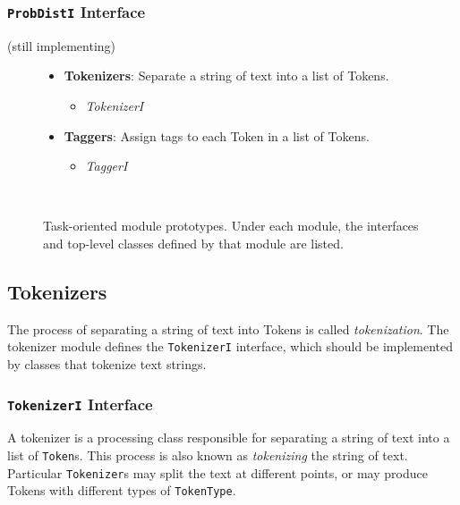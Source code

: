\documentclass{article}
\begin{document}
\subsubsection{\texttt{ProbDistI} Interface}

(still implementing)

\begin{figure}
\noindent
\begin{centering}
\begin{boxedminipage}{.95\textwidth}
\begin{itemize}
  \item \textbf{Tokenizers}: Separate a string of text into a list of
       Tokens. 
  \begin{itemize}
     \item \textit{TokenizerI}
  \end{itemize}

  \item \textbf{Taggers}: Assign tags to each Token in a list of Tokens.
  \begin{itemize}
     \item \textit{TaggerI}
  \end{itemize}
\end{itemize}
\end{boxedminipage}\\
\end{centering}
 \caption[Task-oriented module prototypes]{Task-oriented module
 prototypes.  Under each module, the interfaces and top-level classes
 defined by that module are listed.}
\label{fig:mod-task}
\end{figure}

\subsection{Tokenizers}

The process of separating a string of text into Tokens is called
\emph{tokenization}.  The tokenizer module defines the
\texttt{TokenizerI} interface, which should be implemented by classes
that tokenize text strings.

\subsubsection{\texttt{TokenizerI} Interface}

    A tokenizer is a processing class responsible for separating a
    string of text into a list of \texttt{Token}s.  This process
    is also known as \emph{tokenizing} the string of text.  Particular
    \texttt{Tokenizer}s may split the text at different points, or
    may produce Tokens with different types of \texttt{TokenType}.
\end{document}
